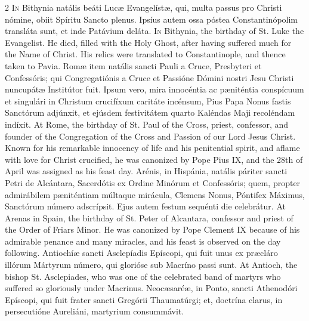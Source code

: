 \begin{paracol}{2}
\lettrine[lines=2]{I}{n} Bithynia natális 
 beáti Lucæ Evangelístæ, qui, multa passus pro Christi nómine, obiit Spíritu 
 Sancto plenus. Ipsíus autem ossa póstea Constantinópolim transláta 
 sunt, et inde Patávium deláta.
\switchcolumn
{}
\lettrine[lines=2]{I}{n} Bithynia, the birthday of St. 
 Luke the Evangelist. He died, filled with the Holy Ghost, after having 
 suffered much for the Name of Christ. His relics were translated to 
 Constantinople, and thence taken to Pavia.
\switchcolumn*
{}
Romæ item natális 
 sancti Pauli a Cruce, Presbyteri et Confessóris; qui Congregatiónis a Cruce 
 et Passióne Dómini nostri Jesu Christi nuncupátæ Institútor fuit. 
 Ipsum vero, mira innocéntia ac pæniténtia conspícuum et singulári in 
 Christum crucifíxum caritáte incénsum, Pius Papa Nonus fastis Sanctórum 
 adjúnxit, et ejúsdem festivitátem quarto Kaléndas Maji recoléndam indíxit.
\switchcolumn
{}
At Rome, the birthday of St. Paul of 
 the Cross, priest, confessor, and founder of the Congregation of the Cross 
 and Passion of our Lord Jesus Christ. Known for his remarkable 
 innocency of life and his penitential spirit, and aflame with love for 
 Christ crucified, he was canonized by Pope Pius IX, and the 28th of April 
 was assigned as his feast day.
\switchcolumn*
{}
Arénis, in Hispánia, 
 natális páriter sancti Petri de Alcántara, Sacerdótis ex Ordine Minórum et 
 Confessóris; quem, propter admirábilem pæniténtiam múltaque mirácula, 
 Clemens Nonus, Póntifex Máximus, Sanctórum número adscrípsit. Ejus 
 autem festum sequénti die celebrátur.
\switchcolumn
{}
At Arenas in Spain, the birthday of 
 St. Peter of Alcantara, confessor and priest of the Order of Friars Minor. 
 He was canonized by Pope Clement IX because of his admirable penance and 
 many miracles, and his feast is observed on the day following.
\switchcolumn*
{}
Antiochíæ sancti 
 Asclepíadis Epíscopi, qui fuit unus ex præcláro illórum Mártyrum número, qui 
 glorióse sub Macríno passi sunt.
\switchcolumn
{}
At Antioch, the bishop St. 
 Asclepiades, who was one of the celebrated band of martyrs who suffered so 
 gloriously under Macrinus.
\switchcolumn*
{}
Neocæsaréæ, in Ponto, 
 sancti Athenodóri Epíscopi, qui fuit frater sancti Gregórii Thaumatúrgi; et, 
 doctrína clarus, in persecutióne Aureliáni, martyrium consummávit.
\switchcolumn
{}

\end{paracol}
